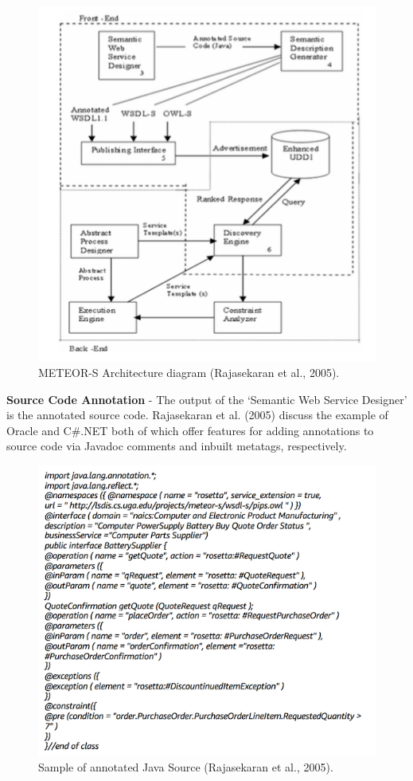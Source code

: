 \documentclass{article}
\begin{document}
\begin{itemize}
\begin{figure}[h!]
\includegraphics{meteors_arch_diagram.png}
\caption{METEOR-S Architecture diagram (Rajasekaran et al., 2005).}
\end{figure}

\pagebreak 

\textbf{Source Code Annotation} - The output of the ‘Semantic Web Service Designer’ is the annotated source code. Rajasekaran et al. (2005) discuss the example of Oracle and C\#.NET both of which offer features for adding annotations to source code via Javadoc comments and inbuilt metatags, respectively. 

\begin{figure}[h!]
\includegraphics{annotatedjava1.png}
\caption{Sample of annotated Java Source (Rajasekaran et al., 2005).}
\end{figure}


\end{itemize}
\end{document}
